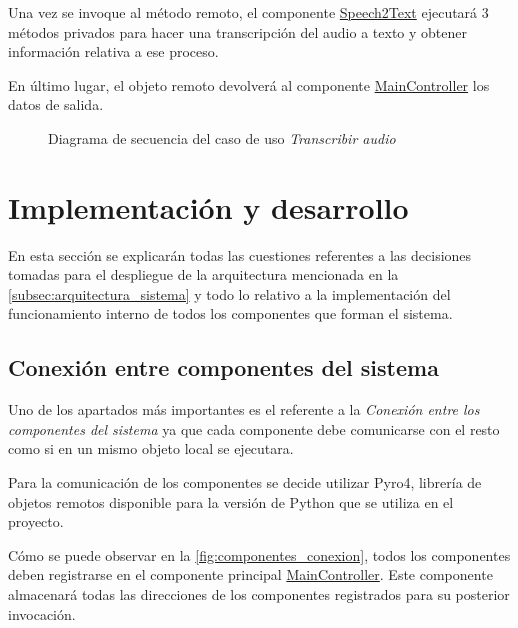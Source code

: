 \documentclass[../main.tex]{subfiles}
\begin{document}
Una vez se invoque al método remoto, el componente \hyperref[par:speech2text]{Speech2Text} ejecutará 3 métodos privados para hacer una transcripción del audio a texto y obtener información relativa a ese proceso.

En último lugar, el objeto remoto devolverá al componente \hyperref[par:maincontroller]{MainController} los datos de salida.

\begin{figure}[H]
    \centering
    
    \caption{Diagrama de secuencia del caso de uso \textit{Transcribir audio}}
    \label{fig:flow_spech2text}
\end{figure}


\section{Implementación y desarrollo}\label{sec:implementacion}

En esta sección se explicarán todas las cuestiones referentes a las decisiones tomadas para el despliegue de la arquitectura mencionada en la \autoref{subsec:arquitectura_sistema} y todo lo relativo a la implementación del funcionamiento interno de todos los componentes que forman el sistema.

\subsection{Conexión entre componentes del sistema}\label{subsec:impl_conexion}
Uno de los apartados más importantes es el referente a la \textit{Conexión entre los componentes del sistema} ya que cada componente debe comunicarse con el resto como si en un mismo objeto local se ejecutara.

Para la comunicación de los componentes se decide utilizar Pyro4, librería de objetos remotos disponible para la versión de Python que se utiliza en el proyecto.

Cómo se puede observar en la \autoref{fig:componentes_conexion}, todos los componentes deben registrarse en el componente principal \hyperref[par:maincontroller]{MainController}. Este componente almacenará todas las direcciones de los componentes registrados para su posterior invocación.
\end{document}
